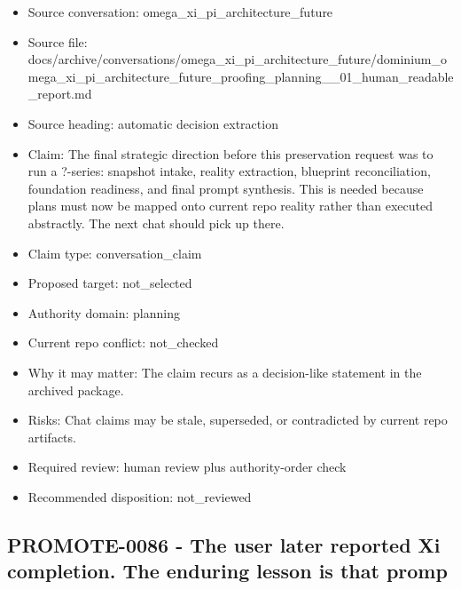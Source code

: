 \documentclass[11pt,a4paper]{report}
\begin{document}
\begin{itemize}
\item Source conversation: omega\_xi\_pi\_architecture\_future
\item Source file: docs/archive/conversations/omega\_xi\_pi\_architecture\_future/dominium\_omega\_xi\_pi\_architecture\_future\_proofing\_planning\_\_01\_human\_readable\_report.md
\item Source heading: automatic decision extraction
\item Claim: The final strategic direction before this preservation request was to run a ?-series: snapshot intake, reality extraction, blueprint reconciliation, foundation readiness, and final prompt synthesis. This is needed because plans must now be mapped onto current repo reality rather than executed abstractly. The next chat should pick up there.
\item Claim type: conversation\_claim
\item Proposed target: not\_selected
\item Authority domain: planning
\item Current repo conflict: not\_checked
\item Why it may matter: The claim recurs as a decision-like statement in the archived package.
\item Risks: Chat claims may be stale, superseded, or contradicted by current repo artifacts.
\item Required review: human review plus authority-order check
\item Recommended disposition: not\_reviewed
\end{itemize}

\subsection{PROMOTE-0086 - The user later reported Xi completion. The enduring lesson is that promp}
\end{document}
